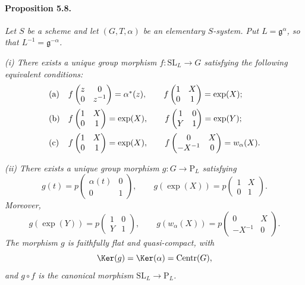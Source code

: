 \paragraph{\textbf{Proposition 5.8.}}
\emph{Let \(S\) be a scheme and let \((G,T,\alpha)\) be an
elementary \(S\)-system.  Put \(L=\mathfrak g^\alpha\), so that
\(L^{-1}=\mathfrak g^{-\alpha}\).}

\emph{\textup{(i)} There exists a unique group morphism
\(f\colon\mathrm{SL}_L\to G\) satisfying the following equivalent
conditions:}
\[
\begin{array}{ll}
\textup{(a)}
&
f\begin{pmatrix}z&0\\0&z^{-1}\end{pmatrix}=\alpha^\ast(z),
\qquad
f\begin{pmatrix}1&X\\0&1\end{pmatrix}=\exp(X);
\\[1.1em]
\textup{(b)}
&
f\begin{pmatrix}1&X\\0&1\end{pmatrix}=\exp(X),
\qquad
f\begin{pmatrix}1&0\\Y&1\end{pmatrix}=\exp(Y);
\\[1.1em]
\textup{(c)}
&
f\begin{pmatrix}1&X\\0&1\end{pmatrix}=\exp(X),
\qquad
f\begin{pmatrix}0&X\\-X^{-1}&0\end{pmatrix}=w_\alpha(X).
\end{array}
\]

\emph{\textup{(ii)} There exists a unique group morphism
\(g\colon G\to\mathrm P_L\) satisfying}
\[
 g(t)=
 p\begin{pmatrix}\alpha(t)&0\\0&1\end{pmatrix},
 \qquad
 g(\exp(X))
 =p\begin{pmatrix}1&X\\0&1\end{pmatrix}.
\]
\emph{Moreover,}
\[
 g(\exp(Y))
 =p\begin{pmatrix}1&0\\Y&1\end{pmatrix},
 \qquad
 g(w_\alpha(X))
 =p\begin{pmatrix}0&X\\-X^{-1}&0\end{pmatrix}.
\]
\emph{The morphism \(g\) is faithfully flat and quasi-compact, with}
\[
 \Ker(g)=\Ker(\alpha)=\operatorname{Centr}(G),
\]
\emph{and \(g\circ f\) is the canonical morphism
\(\mathrm{SL}_L\to\mathrm P_L\).}


